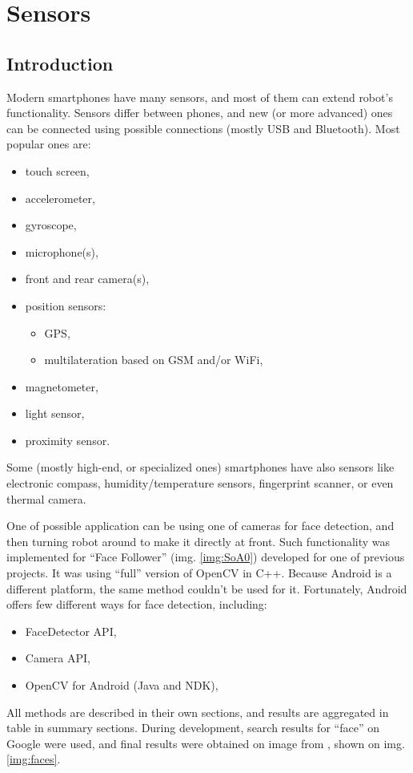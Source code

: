\chapter{Sensors}

\section{Introduction}
Modern smartphones have many sensors, and most of them can extend robot's
functionality.
Sensors differ between phones, and new (or more advanced) ones can
be connected using possible connections (mostly USB and Bluetooth).
Most popular ones are:
\begin{itemize}
  \item touch screen,
  \item accelerometer,
  \item gyroscope,
  \item microphone(s),
  \item front and rear camera(s),
  \item position sensors:
  \begin{itemize}
    \item GPS,
    \item multilateration based on GSM and/or WiFi,
  \end{itemize}
  \item magnetometer,
  \item light sensor,
  \item proximity sensor.
\end{itemize}
Some (mostly high-end, or specialized ones) smartphones have also sensors like
electronic compass, humidity/temperature sensors, fingerprint scanner, or even
thermal camera.

One of possible application can be using one of cameras for face detection, and
then turning robot around to make it directly at front. 
Such functionality was implemented for ``Face Follower'' (img. \ref{img:SoA0})
developed for one of previous projects. 
It was using ``full'' version of OpenCV in C++. 
Because Android is a different platform, the same method couldn't be used for
it.
Fortunately, Android offers few different ways for face detection, including:
\begin{itemize}
  \item FaceDetector API,
  \item Camera API,
  \item OpenCV for Android (Java and NDK),
\end{itemize}
All methods are described in their own sections, and results are aggregated in
table in summary sections. 
During development, search results for ``face'' on Google were used, and final
results were obtained on image from \cite{faces}, shown on img. \ref{img:faces}.

